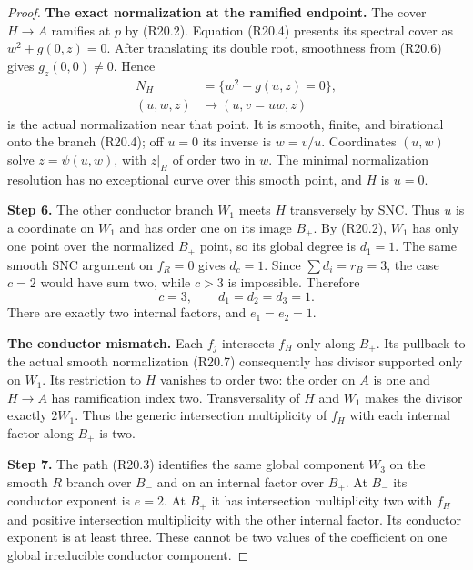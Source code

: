 \begin{proof}
\par\medskip\noindent\textbf{The exact normalization at the ramified endpoint.}
The cover $H\to A$ ramifies at $p$ by (R20.2).
Equation (R20.4) presents its spectral cover as
$w^2+g(0,z)=0$. After translating its double
root, smoothness from (R20.6) gives
$g_z(0,0)\ne0$. Hence
\[
 \begin{split}
        N_H&=\{w^2+g(u,z)=0\},\\
        (u,w,z)&\longmapsto(u,v=uw,z)
 \end{split}                                                   \tag{R20.7}
\]
is the actual normalization near that point.
It is smooth, finite, and birational onto the
branch (R20.4); off $u=0$ its inverse is
$w=v/u$. Coordinates $(u,w)$ solve
$z=\psi(u,w)$, with $z|_H$ of order two in
$w$. The minimal normalization resolution
has no exceptional curve over this smooth
point, and $H$ is $u=0$.

\noindent\textbf{Step 6.} The other conductor branch $W_1$ meets $H$
transversely by SNC. Thus $u$ is a coordinate
on $W_1$ and has order one on its image
$B_+$. By (R20.2), $W_1$ has only one point
over the normalized $B_+$ point, so its
global degree is $d_1=1$. The same smooth
SNC argument on $f_R=0$ gives $d_c=1$.
Since $\sum d_i=r_B=3$, the case $c=2$
would have sum two, while $c>3$ is impossible.
Therefore
\[
                 c=3,\qquad d_1=d_2=d_3=1.              \tag{R20.8}
\]
There are exactly two internal factors, and
$e_1=e_2=1$.

\par\medskip\noindent\textbf{The conductor mismatch.}
Each $f_j$ intersects $f_H$ only along $B_+$.
Its pullback to the actual smooth normalization
(R20.7) consequently has divisor supported
only on $W_1$. Its restriction to $H$ vanishes
to order two: the order on $A$ is one and
$H\to A$ has ramification index two.
Transversality of $H$ and $W_1$ makes the
divisor exactly $2W_1$. Thus the generic
intersection multiplicity of $f_H$ with
each internal factor along $B_+$ is two.

\noindent\textbf{Step 7.} The path (R20.3) identifies the same global
component $W_3$ on the smooth $R$ branch
over $B_-$ and on an internal factor over
$B_+$. At $B_-$ its conductor exponent is
$e=2$. At $B_+$ it has intersection
multiplicity two with $f_H$ and positive
intersection multiplicity with the other
internal factor. Its conductor exponent
is at least three. These cannot be two
values of the coefficient on one global
irreducible conductor component.


\end{proof}
